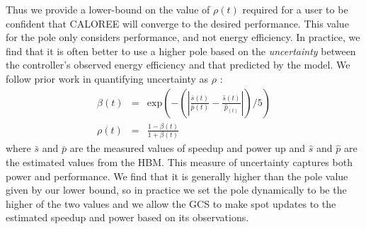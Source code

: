 Thus we provide a lower-bound on the value of $\rho(t)$ required for a
user to be confident that CALOREE will converge to the desired
performance.  This value for the pole only considers performance,
and not energy efficiency.  In practice, we find that it is
often better to use a higher pole based on the \emph{uncertainty}
between the controller's observed energy efficiency and that predicted
by the model.  We follow prior work in quantifying uncertainty as
$\rho$ \cite{Tokic2010}:
\begin{equation}
  \begin{array}{rcl}
    \beta(t) &=&  \text{exp}{\left(- \left( \left|   \frac{\bar{s}(t)}{\bar{p}(t)}  -\frac{ \hat{s}(t)}{\hat{p}_(t)} \right| \right) /5\right)} \\
    \rho(t) &=& \frac{1-\beta(t)}{1+\beta(t)} 
  \end{array}
  \label{eqn:uncer}
\end{equation}
where $\bar{s}$ and $\bar{p}$ are the measured values of speedup and
power up and $\hat{s}$ and $\hat{p}$ are the estimated values from the
HBM.  This measure of uncertainty captures both power and performance.
We find that it is generally higher than the pole value given by our
lower bound, so in practice we set the pole dynamically to be the
higher of the two values and we allow the GCS to make spot updates to
the estimated speedup and power based on its observations.  
